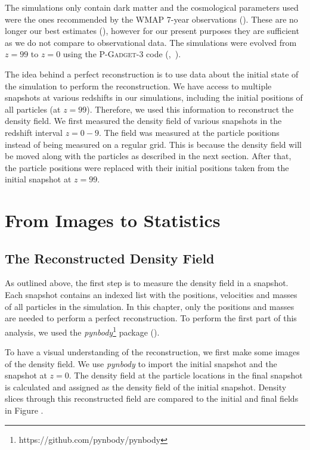 The simulations only contain dark matter and the cosmological parameters used were the ones recommended by the WMAP 7-year observations (\cite{2011ApJS..192...18K}). These are no longer our best estimates (\cite{2016A&A...594A..13P}), however for our present purposes they are sufficient as we do not compare to observational data. The simulations were evolved from $z=99$ to $z=0$ using the \textsc{P-Gadget-3} code (\cite{2005MNRAS.364.1105S},~\cite{2008MNRAS.391.1685S}). 

The idea behind a perfect reconstruction is to use data about the initial state of the simulation to perform the reconstruction. We have access to multiple snapshots at various redshifts in our simulations, including the initial positions of all particles (at $z = 99$). Therefore, we used this information to reconstruct the density field. We first measured the density field of various snapshots in the redshift interval $z = 0 - 9$. The field was measured at the particle positions instead of being measured on a regular grid. This is because the density field will be moved along with the particles as described in the next section. After that, the particle positions were replaced with their initial positions taken from the initial snapshot at $z = 99$.




\section{From Images to Statistics}


\subsection{The Reconstructed Density Field}

As outlined above, the first step is to measure the density field in a snapshot. Each snapshot contains an indexed list with the positions, velocities and masses of all particles in the simulation. In this chapter, only the positions and masses are needed to perform a perfect reconstruction. To perform the first part of this analysis, we used the \textit{pynbody}\footnote{https://github.com/pynbody/pynbody} package (\cite{2013ascl.soft05002P}). 

To have a visual understanding of the reconstruction, we first make some images of the density field. We use \textit{pynbody} to import the initial snapshot and the snapshot at $z=0$. The density field at the particle locations in the final snapshot is calculated and assigned as the density field of the initial snapshot. Density slices through this reconstructed field are compared to the initial and final fields in Figure . 


